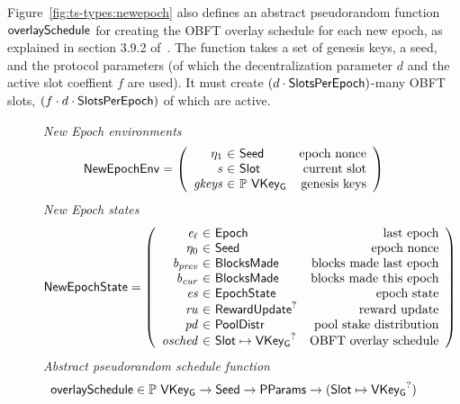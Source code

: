 Figure~\ref{fig:ts-types:newepoch} also defines an abstract pseudorandom function
$\mathsf{overlaySchedule}$ for creating the OBFT overlay schedule for each new epoch,
as explained in section 3.9.2 of~\cite{delegation_design}.
The function takes a set of genesis keys, a seed, and the protocol parameters
(of which the decentralization parameter $d$ and the active slot coeffient $f$ are used).
It must create $(d\cdot\mathsf{SlotsPerEpoch})$-many OBFT slots, $(f\cdot d\cdot \mathsf{SlotsPerEpoch})$
of which are active.

\begin{figure}
  \emph{New Epoch environments}
  \begin{equation*}
    \NewEpochEnv =
    \left(
      \begin{array}{r@{~\in~}lr}
        \eta_1 & \Seed & \text{epoch nonce} \\
        \var{s} & \Slot & \text{current slot} \\
        \var{gkeys} & \powerset{\VKeyGen} & \text{genesis keys} \\
      \end{array}
    \right)
  \end{equation*}
  \emph{New Epoch states}
  \begin{equation*}
    \NewEpochState =
    \left(
      \begin{array}{r@{~\in~}lr}
        \var{e_\ell} & \Epoch & \text{last epoch} \\
        \eta_0 & \Seed & \text{epoch nonce} \\
        \var{b_{prev}} & \BlocksMade & \text{blocks made last epoch} \\
        \var{b_{cur}} & \BlocksMade & \text{blocks made this epoch} \\
        \var{es} & \EpochState & \text{epoch state} \\
        \var{ru} & \RewardUpdate^? & \text{reward update} \\
        \var{pd} & \PoolDistr & \text{pool stake distribution} \\
        \var{osched} & \Slot\mapsto\VKeyGen^? & \text{OBFT overlay schedule} \\
      \end{array}
    \right)
  \end{equation*}
  \emph{Abstract pseudorandom schedule function}
  \begin{align*}
    & \fun{overlaySchedule} \in \powerset{\VKeyGen} \to \Seed \to \PParams
        \to (\Slot\mapsto\VKeyGen^?) \\

\end{align*}
\end{figure}

